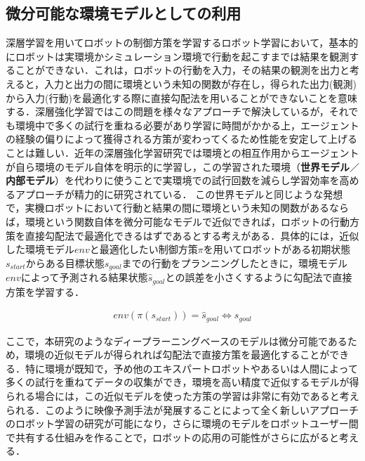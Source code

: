 \subsection{微分可能な環境モデルとしての利用}

  深層学習を用いてロボットの制御方策を学習するロボット学習において，基本的にロボットは実環境かシミュレーション環境で行動を起こすまでは結果を観測することができない．これは，ロボットの行動を入力，その結果の観測を出力と考えると，入力と出力の間に環境という未知の関数が存在し，得られた出力(観測)から入力(行動)を最適化する際に直接勾配法を用いることができないことを意味する．深層強化学習ではこの問題を様々なアプローチで解決しているが，それでも環境中で多くの試行を重ねる必要があり学習に時間がかかる上，エージェントの経験の偏りによって獲得される方策が変わってくるため性能を安定して上げることは難しい．近年の深層強化学習研究では環境との相互作用からエージェントが自ら環境のモデル自体を明示的に学習し，この学習された環境（{\bf 世界モデル}／{\bf 内部モデル}）\cite{ha1803world}を代わりに使うことで実環境での試行回数を減らし学習効率を高めるアプローチが精力的に研究されている．
  この世界モデルと同じような発想で，実機ロボットにおいて行動と結果の間に環境という未知の関数があるならば，環境という関数自体を微分可能なモデルで近似できれば，ロボットの行動方策を直接勾配法で最適化できるはずであるとする考えがある\cite{schmidhuber1990making}．具体的には，近似した環境モデル$env$と最適化したい制御方策$\pi$を用いてロボットがある初期状態$s_{start}$からある目標状態$s_{goal}$までの行動をプランニングしたときに，環境モデル$env$によって予測される結果状態$\hat{s}_{goal}$との誤差を小さくするように勾配法で直接方策を学習する．

  \begin{eqnarray}
    env(\pi(s_{start})) = \hat{s}_{goal} \Leftrightarrow s_{goal} \nonumber
  \end{eqnarray}

  ここで，本研究のようなディープラーニングベースのモデルは微分可能であるため，環境の近似モデルが得られれば勾配法で直接方策を最適化することができる．特に環境が既知で，予め他のエキスパートロボットやあるいは人間によって多くの試行を重ねてデータの収集ができ，環境を高い精度で近似するモデルが得られる場合には，この近似モデルを使った方策の学習は非常に有効であると考えられる．このように映像予測手法が発展することによって全く新しいアプローチのロボット学習の研究が可能になり，さらに環境のモデルをロボットユーザー間で共有する仕組みを作ることで，ロボットの応用の可能性がさらに広がると考える．
